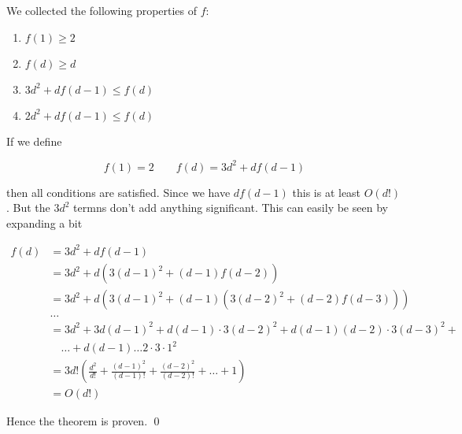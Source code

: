 \begin{pr}
We collected the following properties of $f$:
\begin{enumerate}
\item \label{seidelFone} $f(1)\geq 2$
\item \label{seidelFtwo} $f(d)\geq d$
\item \label{seidelFthree} $3d^2+df(d-1) \leq f(d)$
\item \label{seidelFfour} $2d^2+df(d-1) \leq f(d)$
\end{enumerate}

If we define 

\[f(1) = 2 \qquad f(d) = 3d^2 + df(d-1)\]

then all conditions are satisfied. Since we have $df(d-1)$ this is at least $O(d!)$. But the $3d^2$ termns don't add anything significant. This can easily be seen by expanding a bit

\begin{align*}
f(d) &= 3d^2 + df(d-1)\\
	&= 3d^2+d(3(d-1)^2 + (d-1)f(d-2))\\
	&= 3d^2+d(3(d-1)^2 + (d-1)(3(d-2)^2 + (d-2)f(d-3)))\\
	&\hdots\\
	&=3d^2 +3d(d-1)^2 + d(d-1)\cdot 3(d-2)^2 + d(d-1)(d-2) \cdot 3(d-3)^2 +\\
	&\quad \ldots + d(d-1)\ldots 2\cdot 3 \cdot 1^2\\
	&=3d! \left(\frac{d^2}{d!} + \frac{(d-1)^2}{(d-1)!} + \frac{(d-2)^2}{(d-2)!} + \ldots + 1\right)\\
	&= O(d!)
\end{align*}

Hence the theorem is proven.
\qed \end{pr}




